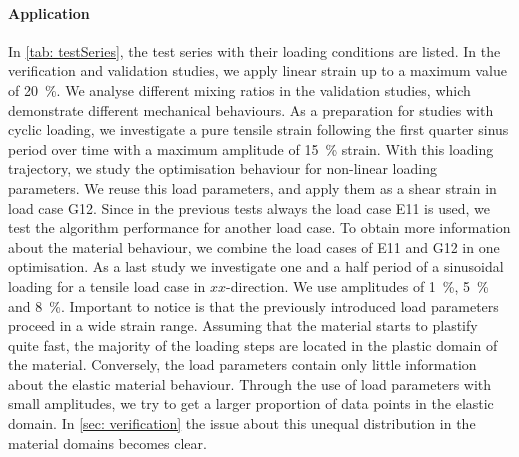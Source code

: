 \paragraph{Application}
In \autoref{tab: testSeries}, the test series with their loading conditions are listed.
In the verification and validation studies, we apply linear strain up to a maximum value of 20 \%.
We analyse different mixing ratios in the validation studies, which demonstrate different mechanical behaviours.
As a preparation for studies with cyclic loading, we investigate a pure tensile strain following the first quarter sinus period over time with a maximum amplitude of 15 \% strain. With this loading trajectory, we study the optimisation behaviour for non-linear loading parameters.
We reuse this load parameters, and apply them as a shear strain in load case G12. Since in the previous tests always the load case E11 is used, we test the algorithm performance for another load case.
To obtain more information about the material behaviour, we combine the load cases of E11 and G12 in one optimisation. 
As a last study we investigate one and a half period of a sinusoidal loading for a tensile load case in $xx$-direction. We use amplitudes of 1 \%, 5 \% and 8 \%. Important to notice is that the previously introduced load parameters proceed in a wide strain range. Assuming that the material starts to plastify quite fast, the majority of the loading steps are located in the plastic domain of the material. Conversely, the load parameters contain only little information about the elastic material behaviour. 
Through the use of load parameters with small amplitudes, we try to get a larger proportion of data points in the elastic domain.
In \autoref{sec: verification} the issue about this unequal distribution in the material domains becomes clear.    

